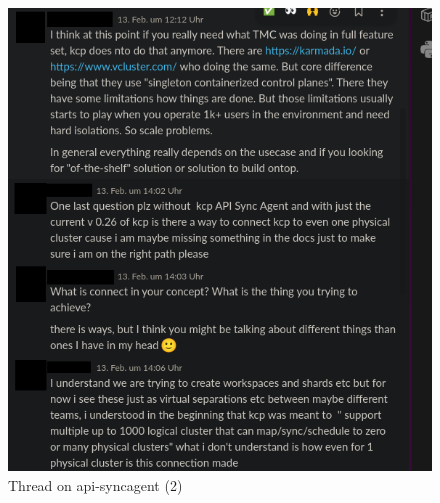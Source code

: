 \documentclass[11pt, a4paper, oneside, listof=totoc]{scrartcl}
\begin{document}
                \begin{figure}[h!]
                    \centering
                    \includegraphics[width=\textwidth]{screenshots/slack/apisyncagent2.anonymized.png}
                    \caption{Thread on api-syncagent (2)}\label{fig:api-syncagent2}
                \end{figure}
\end{document}
